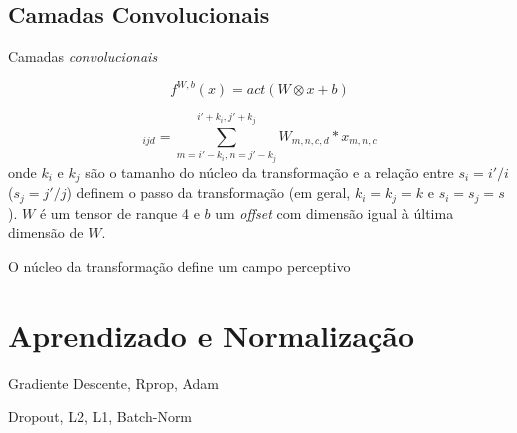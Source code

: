 \subsection{Camadas Convolucionais}

Camadas \textit{convolucionais} 


\begin{equation}
f^{W,b}(x) = act(W \otimes x + b)
\end{equation}

\begin{equation}
[W \otimes x]_{ijd} = \sum_{m=i'-k_i, n=j'-k_j}^{i'+ k_i, j'+k_j} W_{m, n, c, d} * x_{m, n, c}
\end{equation}
onde $k_i$ e $k_j$ são o tamanho do núcleo da transformação e a relação entre $s_i = i'/i$ ($s_j = j'/j$) definem o passo da transformação (em geral, $k_i = k_j = k$ e $s_i = s_j = s$). $W$ é um tensor de ranque 4 e $b$ um \textit{offset} com dimensão igual à última dimensão de $W$.

O núcleo da transformação define um campo perceptivo

\section{Aprendizado e Normalização}

Gradiente Descente, Rprop, Adam

Dropout, L2, L1, Batch-Norm




